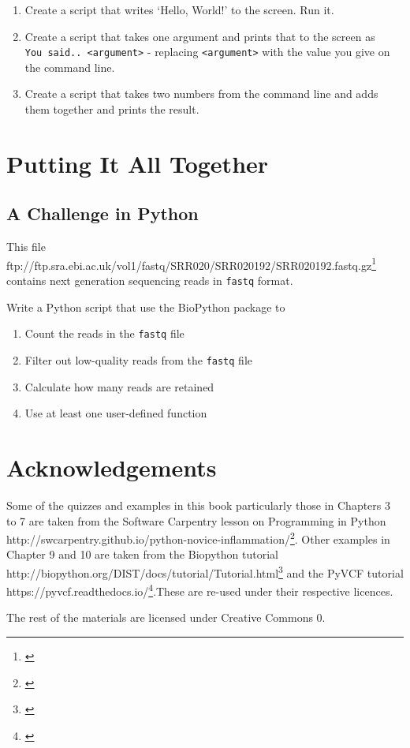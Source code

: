 \documentclass[]{book}
\providecommand{\tightlist}{%
  \setlength{\itemsep}{0pt}\setlength{\parskip}{0pt}}
\let\rmarkdownfootnote\footnote%
\def\footnote{\protect\rmarkdownfootnote}
\renewcommand{\href}[2]{#2\footnote{\url{#1}}}
\theoremstyle{definition}
\theoremstyle{definition}
\theoremstyle{definition}
\theoremstyle{remark}
\begin{document}
\begin{enumerate}
\def\labelenumi{\arabic{enumi}.}
\tightlist
\item
  Create a script that writes `Hello, World!' to the screen. Run it.
\item
  Create a script that takes one argument and prints that to the screen
  as \texttt{You\ said..\ \textless{}argument\textgreater{}} - replacing
  \texttt{\textless{}argument\textgreater{}} with the value you give on
  the command line.
\item
  Create a script that takes two numbers from the command line and adds
  them together and prints the result.
\end{enumerate}

\hypertarget{putting-it-all-together}{%
\chapter{Putting It All Together}\label{putting-it-all-together}}

\hypertarget{a-challenge-in-python}{%
\section{A Challenge in Python}\label{a-challenge-in-python}}

This file
\href{}{ftp://ftp.sra.ebi.ac.uk/vol1/fastq/SRR020/SRR020192/SRR020192.fastq.gz}
contains next generation sequencing reads in \texttt{fastq} format.

Write a Python script that use the BioPython package to

\begin{enumerate}
\def\labelenumi{\arabic{enumi}.}
\tightlist
\item
  Count the reads in the \texttt{fastq} file
\item
  Filter out low-quality reads from the \texttt{fastq} file
\item
  Calculate how many reads are retained
\item
  Use at least one user-defined function
\end{enumerate}

\hypertarget{acknowledgements}{%
\chapter{Acknowledgements}\label{acknowledgements}}

Some of the quizzes and examples in this book particularly those in
Chapters 3 to 7 are taken from the Software Carpentry lesson on
Programming in Python
\href{}{http://swcarpentry.github.io/python-novice-inflammation/}. Other
examples in Chapter 9 and 10 are taken from the Biopython tutorial
\href{}{http://biopython.org/DIST/docs/tutorial/Tutorial.html} and the
PyVCF tutorial \href{}{https://pyvcf.readthedocs.io/}.These are re-used
under their respective licences.

The rest of the materials are licensed under Creative Commons 0.


\end{document}
